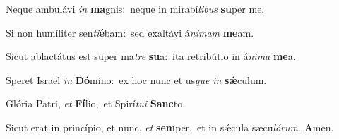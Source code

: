 Neque ambulávi \textit{in} \textbf{ma}gnis:~\redgreheightstar neque in mirabí\textit{li}\textit{bus} \textbf{su}per me.

Si non humíliter sen\textit{ti}\textbf{é}bam:~\redgreheightstar sed exaltávi á\textit{ni}\textit{mam} \textbf{me}am.

Sicut ablactátus est super ma\textit{tre} \textbf{su}a:~\redgreheightstar ita retribútio in á\textit{ni}\textit{ma} \textbf{me}a.

Speret Israël \textit{in} \textbf{Dó}mino:~\redgreheightstar ex hoc nunc et us\textit{que} \textit{in} \textbf{sǽ}culum.

Glória Patri, \textit{et} \textbf{Fí}lio,~\redgreheightstar et Spirí\textit{tu}\textit{i} \textbf{Sanc}to.

Sicut erat in princípio, et nunc, \textit{et} \textbf{sem}per,~\redgreheightstar et in sǽcula sæcu\textit{ló}\textit{rum}. \textbf{A}men.


